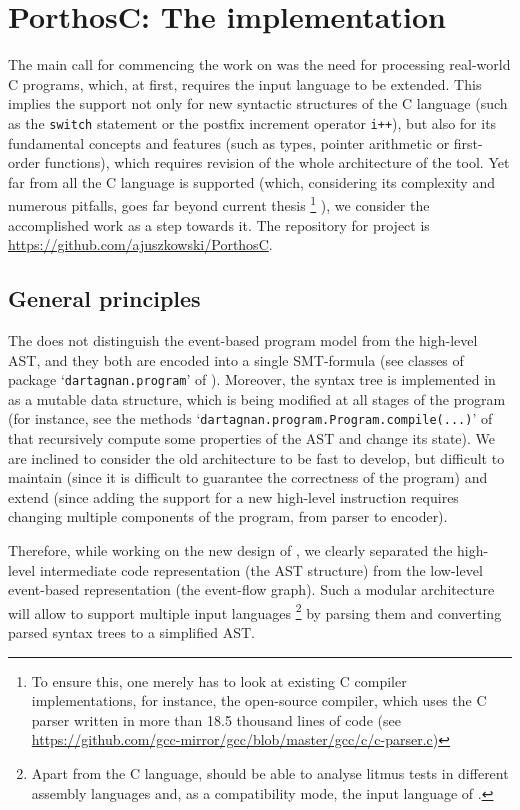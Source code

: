 \chapter{PorthosC: The implementation}
\label{ch:impl}

The main call for commencing the work on \porthos[2] was the need for processing real-world C programs, which, at first, requires the input language to be extended.
This implies the support not only for new syntactic structures of the C language (such as the \texttt{switch} statement or the postfix increment operator \texttt{i++}), but also for its fundamental concepts and features (such as types, pointer arithmetic or first-order functions), which requires revision of the whole architecture of the tool.
Yet far from all the C language is supported (which, considering its complexity and numerous pitfalls, goes far beyond current thesis%
%
\footnote{To ensure this, one merely has to look at existing C compiler implementations, for instance, the open-source  compiler, which uses the C parser written in more than 18.5 thousand lines of code (see \url{https://github.com/gcc-mirror/gcc/blob/master/gcc/c/c-parser.c})}%
%
), we consider the accomplished work as a step towards it.
The repository for \porthos[2] project is \url{https://github.com/ajuszkowski/PorthosC}.


\section{General principles}
\label{ch:impl:principles}

The \porthos[1] does not distinguish the event-based program model from the high-level AST, and they both are encoded into a single SMT-formula (see classes of package `\texttt{dartagnan.program}' of \porthos[1]).
Moreover, the syntax tree is implemented in \porthos[1] as a mutable data structure, which is being modified at all stages of the program (for instance, see the methods `\texttt{dartagnan.program.Program.compile(...)}' of \porthos[1] that recursively compute some properties of the AST and change its state).
We are inclined to consider the old architecture to be fast to develop, but difficult to maintain (since it is difficult to guarantee the correctness of the program) and extend (since adding the support for a new high-level instruction requires changing multiple components of the program, from parser to encoder).

Therefore, while working on the new design of \porthos[2], we clearly separated the high-level intermediate code representation (the AST structure) from the low-level event-based representation (the event-flow graph).
Such a modular architecture will allow to support multiple input languages%
%
\footnote{Apart from the C language, \porthos[2] should be able to analyse litmus tests in different assembly languages and, as a compatibility mode, the input language of \porthos[1].} %
%
by parsing them and converting parsed syntax trees to a simplified AST.

